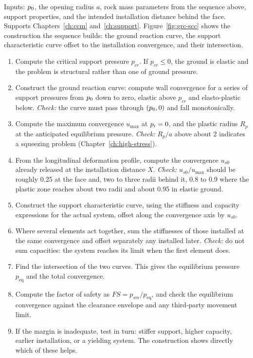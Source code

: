 Inputs: $p_0$, the opening radius $a$, rock mass parameters from the
sequence above, support
properties, and the intended installation distance behind the face. Supports
Chapters~\ref{ch:ccm} and~\ref{ch:support}. Figure~\ref{fig:grc-scc} shows
the construction the sequence builds: the ground reaction curve, the support
characteristic curve offset to the installation convergence, and their
intersection.

\begin{enumerate}
  \item Compute the critical support pressure $p_{cr}$. If
  $p_{cr} \le 0$, the ground is elastic and the problem is
  structural rather than one of ground pressure.

  \item Construct the ground reaction curve: compute wall convergence for a
  series of support pressures from $p_0$ down to zero, elastic above
  $p_{cr}$ and elasto-plastic below.
  \emph{Check:} the curve must pass through $(p_0, 0)$ and fall
  monotonically.

  \item Compute the maximum convergence $u_{\max}$ at $p_i = 0$, and the
  plastic radius $R_p$ at the anticipated equilibrium pressure.
  \emph{Check:} $R_p/a$ above about 2 indicates a squeezing problem
  (Chapter~\ref{ch:high-stress}).

  \item From the longitudinal deformation profile, compute the convergence
  $u_{s0}$ already released at the installation distance $X$.
  \emph{Check:} $u_{s0}/u_{\max}$ should be roughly 0.25 at the face and, two
  to three radii behind it, 0.8 to 0.9 where the plastic zone reaches about two
  radii and about 0.95 in elastic ground.

  \item Construct the support characteristic curve, using the stiffness and
  capacity expressions for the actual system, offset along the convergence
  axis by $u_{s0}$.

  \item Where several elements act together, sum the stiffnesses of those
  installed at the same convergence and offset separately any installed
  later.
  \emph{Check:} do not sum capacities: the system reaches its limit when
  the first element does.

  \item Find the intersection of the two curves. This gives the equilibrium
  pressure $p_{\text{eq}}$ and the total convergence.

  \item Compute the factor of safety as
  $FS = p_{sm}/p_{\text{eq}}$, and check the equilibrium convergence
  against the clearance envelope and any third-party movement limit.

  \item If the margin is inadequate, test in turn: stiffer support, higher
  capacity, earlier installation, or a yielding system. The construction shows
  directly which of these helps.
\end{enumerate}

